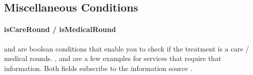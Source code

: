 \subsection{Miscellaneous Conditions}\label{subsec:miscellaneous-conditions}

\paragraph{isCareRound / isMedicalRound}
 and  are boolean conditions that enable you to check if the treatment is a care / medical rounds.
,  and  are a few examples for services that require that information.
Both fields subscribe to the information source .


